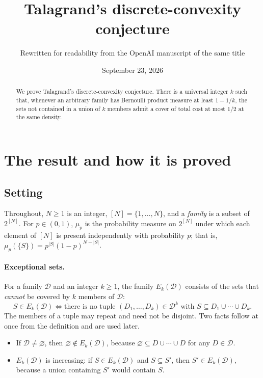 \documentclass[11pt,letterpaper]{article}
\title{Talagrand's discrete-convexity conjecture}
\author{Rewritten for readability from the OpenAI manuscript of the same title}
\date{September 23, 2026}
\theoremstyle{definition}
\theoremstyle{remark}
\numberwithin{equation}{section}
\begin{document}
\maketitle
\begin{abstract}
We prove Talagrand's discrete-convexity conjecture.
There is a universal integer $k$ such that, whenever an arbitrary family has
Bernoulli product measure at least $1-1/k$, the sets not contained
in a union of $k$ members admit a cover of total cost at most $1/2$
at the same density.
\end{abstract}

\section{The result and how it is proved}
\label{sec:introduction}

\subsection{Setting}

Throughout, $N\ge1$ is an integer, $[N]=\{1,\ldots,N\}$, and a
\emph{family} is a subset of $2^{[N]}$. For $p\in(0,1)$, $\mu_p$ is the
probability measure on $2^{[N]}$ under which each element of $[N]$ is
present independently with probability $p$; that is,
$\mu_p(\{S\})=p^{|S|}(1-p)^{N-|S|}$.

\paragraph{Exceptional sets.}
For a family $\mathcal D$ and an integer $k\ge1$, the family
$E_k(\mathcal D)$ consists of the sets that \emph{cannot} be covered by
$k$ members of $\mathcal D$:
\begin{equation}
\label{eq:exceptional-definition}
S\in E_k(\mathcal D)
\iff
\text{there is no tuple }(D_1,\ldots,D_k)\in\mathcal D^k
\text{ with }S\subseteq D_1\cup\cdots\cup D_k .
\end{equation}
The members of a tuple may repeat and need not be disjoint. Two facts
follow at once from the definition and are used later.
\begin{itemize}
\item If $\mathcal D\neq\varnothing$, then $\varnothing\notin E_k(\mathcal D)$,
because $\varnothing\subseteq D\cup\cdots\cup D$ for any $D\in\mathcal D$.
\item $E_k(\mathcal D)$ is increasing: if $S\in E_k(\mathcal D)$ and
$S\subseteq S'$, then $S'\in E_k(\mathcal D)$, because a union containing
$S'$ would contain $S$.
\end{itemize}
\end{document}
